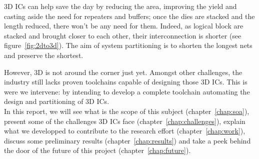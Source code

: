 \documentclass[11pt,a4paper]{report} %
\theoremstyle{customdef}
\begin{document}
3D ICs can help save the day by reducing the area, improving the yield and casting aside the need for repeaters and buffers; once the dies are stacked and the length reduced, there won't be any need for them.
Indeed, as logical block are stacked and brought closer to each other, their interconnection is shorter (see figure~\ref{fig:2dto3d}).
The aim of system partitioning is to shorten the longest nets and preserve the shortest.

However, 3D is not around the corner just yet.
Amongst other challenges, the industry still lacks proven toolchains capable of designing those 3D ICs.
This is were we intervene: by intending to develop a complete toolchain automating the design and partitioning of 3D ICs.\\

In this report, we will see what is the scope of this subject (chapter~\ref{chap:soa}), present some of the challenges 3D ICs face (chapter~\ref{chap:challenges}), explain what we developped to contribute to the research effort (chapter~\ref{chap:work}), discuss some preliminary results (chapter~\ref{chap:results}) and take a peek behind the door of the future of this project (chapter~\ref{chap:future}).






\end{document}
